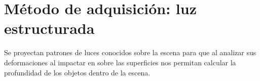 \section{Método de adquisición: luz estructurada}



Se proyectan patrones de luces conocidos sobre la escena para que al analizar
sus deformaciones al impactar en sobre las superficies nos permitan calcular la
profundidad de los objetos dentro de la escena.
